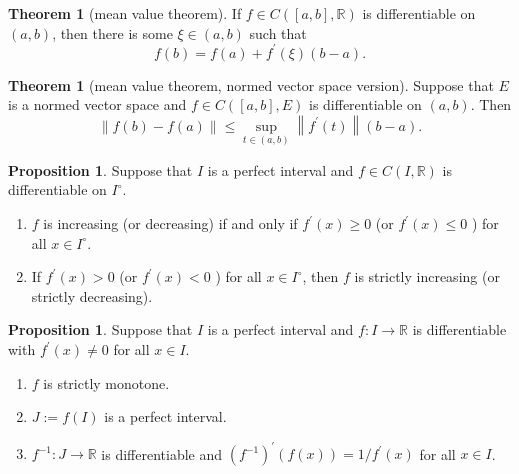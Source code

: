 \documentclass[12pt,a4paper]{book}
\newenvironment{enu}{\begin{enumerate}[(1)]}{\end{enumerate}}
\theoremstyle{definition}
\newtheorem{theo}[defn]{Theorem}
\newtheorem{prop}[defn]{Proposition}
\begin{document}
\begin{theo}[mean value theorem]
    If $f \in C([a, b], \mathbb{R})$ is differentiable on $(a, b)$, then there is some $\xi \in(a, b)$ such that
    $$
    f(b)=f(a)+f^{\prime}(\xi)(b-a) .
    $$
\end{theo}
\begin{theo}[mean value theorem, normed vector space version]
    Suppose that $E$ is a normed vector space and $f \in C([a, b], E)$ is differentiable on $(a, b)$. Then
    $$
    \|f(b)-f(a)\| \leq \sup _{t \in(a, b)}\left\|f^{\prime}(t)\right\|(b-a) .
    $$    
\end{theo}
\begin{prop}
    Suppose that $I$ is a perfect interval and $f \in C(I, \mathbb{R})$ is differentiable on $I^\circ$.
\begin{enu} 
    \item $f$ is increasing (or decreasing) if and only if $f^{\prime}(x) \geq 0$ (or $f^{\prime}(x) \leq 0$ ) for all $x \in I^\circ$.
    \item If $f^{\prime}(x)>0$ (or $f^{\prime}(x)<0$ ) for all $x \in I^\circ$, then $f$ is strictly increasing (or strictly decreasing).
\end{enu}
\end{prop}
\begin{prop}
    Suppose that $I$ is a perfect interval and $f: I \rightarrow \mathbb{R}$ is differentiable with $f^{\prime}(x) \neq 0$ for all $x \in I$.
\begin{enu} 

    \item $f$ is strictly monotone.
    \item $J:=f(I)$ is a perfect interval.
    \item $f^{-1}: J \rightarrow \mathbb{R}$ is differentiable and $\left(f^{-1}\right)^{\prime}(f(x))=1 / f^{\prime}(x)$ for all $x \in I$.
\end{enu}
\end{prop}
\end{document}
